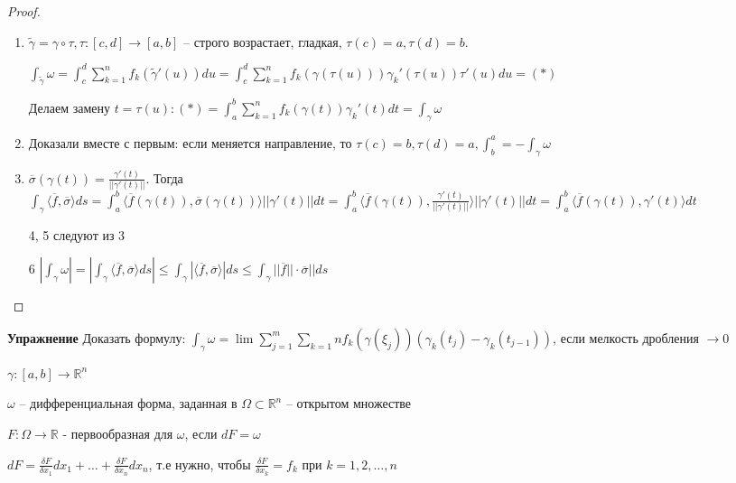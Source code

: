 \begin{proof}
    \begin{enumerate}
        \item $\tilde{\gamma} = \gamma \circ \tau, \tau : [c, d] \to [a, b]$ -- строго возрастает, гладкая, $\tau(c) = a, \tau(d) = b$.

        $\int_{\tilde{\gamma}}^{}\omega = \int_{c}^{d}\sum_{k = 1}^{n}f_k(\tilde{\gamma}'(u))du = \int_{c}^{d}\sum_{k = 1}^{n}f_k(\gamma(\tau(u)))\gamma_k'(\tau(u))\tau'(u)du = (*)$

        Делаем замену $t = \tau(u): (*) = \int_{a}^{b}\sum_{k = 1}^{n}f_k(\gamma(t))\gamma_k'(t)dt = \int_{\gamma}^{}\omega$

        \item Доказали вместе с первым: если меняется направление, то $\tau(c) = b, \tau(d) = a, \int_{b}^{a} = -\int_{\gamma}^{}\omega$

        \item $\overline{\sigma}(\gamma(t)) = \frac{\gamma'(t)}{||\gamma'(t)||}$. Тогда $\int_{\gamma}^{}\langle \overline{f}, \overline{\sigma} \rangle ds = \int_{a}^{b}\langle \overline{f}(\gamma(t)), \overline{\sigma}(\gamma(t)) \rangle ||\gamma'(t)|| dt = \int_{a}^{b} \langle \overline{f}(\gamma(t)), \frac{\gamma'(t)}{||\gamma'(t)||} \rangle||\gamma'(t)||dt = \int_{a}^{b} \langle \overline{f}(\gamma(t)), \gamma'(t) \rangle dt$
        \item[4, 5] следуют из 3
        \item[6] $|\int_{\gamma}^{}\omega| = |\int_{\gamma}^{} \langle \overline{f}, \overline{\sigma} \rangle ds| \leq \int_{\gamma}^{}|\langle \overline{f}, \overline{\sigma} \rangle| ds \leq \int_{\gamma}^{}||\overline{f}|| \cdot \overline{\sigma} || ds$
    \end{enumerate}
\end{proof}


\begin{theorem}\textbf{Упражнение}
    Доказать формулу: $\int_{\gamma}^{}\omega = \lim \sum_{j = 1}^{m} \sum_{k = 1}{n} f_k (\gamma(\xi_j))(\gamma_k(t_j) - \gamma_k(t_{j - 1}))$, если мелкость дробления $\to 0$

    $\gamma: [a, b] \to \mathbb{R}^n$
    
\end{theorem}

\begin{definition}
    $\omega$ -- дифференциальная форма, заданная в $\Omega \subset \mathbb{R}^n$ -- открытом множестве

    $F: \Omega \to \mathbb{R}$ - первообразная для $\omega$, если $dF = \omega$

    $dF = \frac{\delta F}{\delta x_1}dx_1 + \dots + \frac{\delta F}{\delta x_n}dx_n$, т.е нужно, чтобы $\frac{\delta F}{\delta x_k} = f_k$ при $k = 1, 2, \dots, n$
\end{definition}

